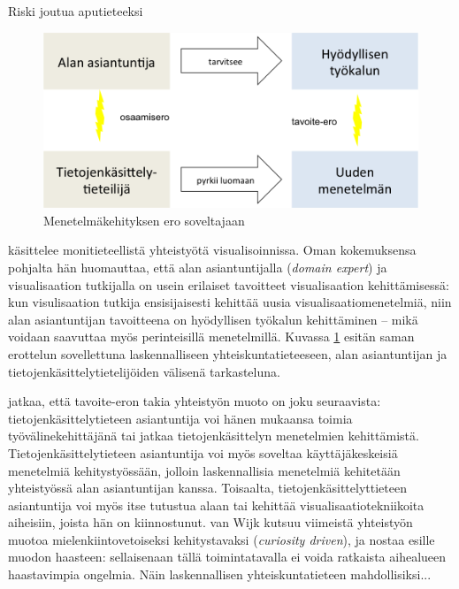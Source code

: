 \documentclass[finnish,gradu,twoside,12pt]{tktltiki}
\begin{document}
{Riski joutua aputieteeksi

\begin{figure}

\includegraphics[width=.6\textwidth]{images/monitieteellisyys_ongelma.png} 
\caption{Menetelmäkehityksen ero soveltajaan \citep[mukaillen][7]{Wijk2006}}
\label{fig:domain_expert_vs_computation_specialist}

\end{figure}

\citet{Wijk2006} käsittelee monitieteellistä yhteistyötä visualisoinnissa. Oman kokemuksensa pohjalta hän huomauttaa, että alan asiantuntijalla (\textit{domain expert}) ja visualisaation tutkijalla on usein erilaiset tavoitteet visualisaation kehittämisessä: kun visulisaation tutkija ensisijaisesti kehittää uusia visualisaatiomenetelmiä, niin alan asiantuntijan tavoitteena on hyödyllisen työkalun kehittäminen -- mikä voidaan saavuttaa myös perinteisillä menetelmillä. Kuvassa \ref{fig:domain_expert_vs_computation_specialist} esitän saman erottelun sovellettuna laskennalliseen yhteiskuntatieteeseen, alan asiantuntijan ja tietojenkäsittelytietelijöiden välisenä tarkasteluna.

\citet{Wijk2006} jatkaa, että tavoite-eron takia yhteistyön muoto on joku seuraavista: tietojenkäsittelytieteen asiantuntija voi hänen mukaansa toimia työvälinekehittäjänä tai jatkaa tietojenkäsittelyn menetelmien kehittämistä. Tietojenkäsittelytieteen asiantuntija voi myös soveltaa käyttäjäkeskeisiä menetelmiä kehitystyössään, jolloin laskennallisia menetelmiä kehitetään yhteistyössä alan asiantuntijan kanssa. Toisaalta, tietojenkäsittelyttieteen asiantuntija voi myös itse tutustua alaan tai kehittää visualisaatiotekniikoita aiheisiin, joista hän on kiinnostunut. van Wijk kutsuu viimeistä yhteistyön muotoa mielenkiintovetoiseksi kehitystavaksi (\textit{curiosity driven}), ja nostaa esille muodon haasteen: sellaisenaan tällä toimintatavalla ei voida ratkaista aihealueen haastavimpia ongelmia. Näin laskennallisen yhteiskuntatieteen mahdollisiksi... 

}
\end{document}
